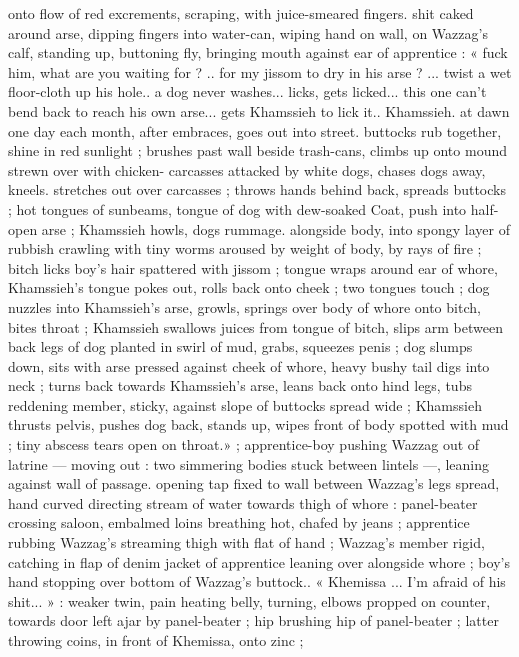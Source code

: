 onto flow of red excrements, scraping, with juice-smeared fingers.
shit caked around arse, dipping fingers into water-can, wiping hand
on wall, on Wazzag's calf, standing up, buttoning fly, bringing mouth
against ear of apprentice : « fuck him, what are you waiting for ? ..
for my jissom to dry in his arse ? ... twist a wet floor-cloth up his
hole.. a dog never washes... licks, gets licked... this one can't bend
back to reach his own arse... gets Khamssieh to lick it.. Khamssieh.
at dawn one day each month, after embraces, goes out into street.
buttocks rub together, shine in red sunlight ; brushes past wall
beside trash-cans, climbs up onto mound strewn over with chicken-
carcasses attacked by white dogs, chases dogs away, kneels.
stretches out over carcasses ; throws hands behind back, spreads
buttocks ; hot tongues of sunbeams, tongue of dog with dew-soaked
Coat, push into half-open arse ; Khamssieh howls, dogs rummage.
alongside body, into spongy layer of rubbish crawling with tiny
worms aroused by weight of body, by rays of fire ; bitch licks boy's
hair spattered with jissom ; tongue wraps around ear of whore,
Khamssieh's tongue pokes out, rolls back onto cheek ; two tongues
touch ; dog nuzzles into Khamssieh’s arse, growls, springs over body
of whore onto bitch, bites throat ; Khamssieh swallows juices from
tongue of bitch, slips arm between back legs of dog planted in swirl
of mud, grabs, squeezes penis ; dog slumps down, sits with arse
pressed against cheek of whore, heavy bushy tail digs into neck ;
turns back towards Khamssieh’s arse, leans back onto hind legs,
tubs reddening member, sticky, against slope of buttocks spread
wide ; Khamssieh thrusts pelvis, pushes dog back, stands up, wipes
front of body spotted with mud ; tiny abscess tears open on throat.»
; apprentice-boy pushing Wazzag out of latrine --- moving out : two
simmering bodies stuck between lintels ---, leaning against wall of
passage. opening tap fixed to wall between Wazzag's legs spread,
hand curved directing stream of water towards thigh of whore :
panel-beater crossing saloon, embalmed loins breathing hot, chafed
by jeans ; apprentice rubbing Wazzag's streaming thigh with flat of
hand ; Wazzag’s member rigid, catching in flap of denim jacket of
apprentice leaning over alongside whore ; boy's hand stopping over
bottom of Wazzag’s buttock.. « Khemissa ... I'm afraid of his shit... »
: weaker twin, pain heating belly, turning, elbows propped on
counter, towards door left ajar by panel-beater ; hip brushing hip of
panel-beater ; latter throwing coins, in front of Khemissa, onto zinc ;

